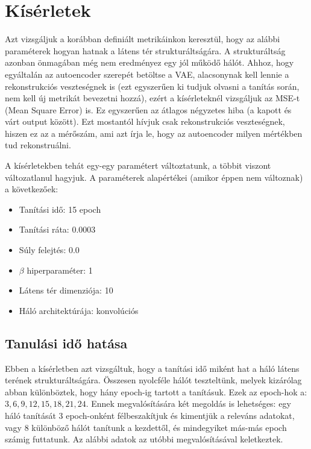 \section{Kísérletek}

Azt vizsgáljuk a korábban definiált metrikáinkon keresztül, hogy az alábbi paraméterek hogyan hatnak a látens tér strukturáltságára. A strukturáltság azonban önmagában még nem eredményez egy jól működő hálót. Ahhoz, hogy egyáltalán az autoencoder szerepét betöltse a VAE, alacsonynak kell lennie a rekonstrukciós veszteségnek is (ezt egyszerűen ki tudjuk olvasni a tanítás során, nem kell új metrikát bevezetni hozzá), ezért a kísérleteknél vizsgáljuk az MSE-t (Mean Square Error) is. Ez egyszerűen az átlagos négyzetes hiba (a kapott és várt output között). Ezt mostantól hívjuk csak rekonstrukciós veszteségnek, hiszen ez az a mérőszám, ami azt írja le, hogy az autoencoder milyen mértékben tud rekonstruálni.

A kísérletekben tehát egy-egy paramétert változtatunk, a többit viszont változatlanul hagyjuk. A paraméterek alapértékei (amikor éppen nem változnak) a következőek:

\begin{itemize}
  \item Tanítási idő: 15 epoch
  \item Tanítási ráta: 0.0003
  \item Súly felejtés: 0.0
  \item $\beta$ hiperparaméter: 1
  \item Látens tér dimenziója: 10
  \item Háló architektúrája: konvolúciós
\end{itemize}

\subsection{Tanulási idő hatása}

Ebben a kísérletben azt vizsgáltuk, hogy a tanítási idő miként hat a háló látens terének strukturáltságára. Összesen nyolcféle hálót teszteltünk, melyek kizárólag abban különböztek, hogy hány epoch-ig tartott a tanításuk. Ezek az epoch-hok a: $3, 6, 9, 12, 15, 18, 21, 24$. Ennek megvalósítására két megoldás is lehetséges: egy háló tanítását $3$ epoch-onként félbeszakítjuk és kimentjük a releváns adatokat, vagy $8$ különböző hálót tanítunk a kezdettől, és mindegyiket más-más epoch számig futtatunk. Az alábbi adatok az utóbbi megvalósításával keletkeztek.


